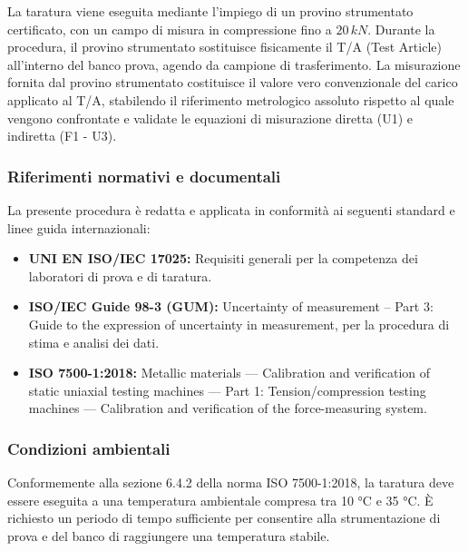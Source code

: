 \documentclass[a4paper, twoside]{article}
\begin{document}
La taratura viene eseguita mediante l'impiego di un provino strumentato certificato, con un campo di misura in compressione fino a $20\,kN$. Durante la procedura, il provino strumentato sostituisce fisicamente il T/A (Test Article) all'interno del banco prova, agendo da campione di trasferimento. La misurazione fornita dal provino strumentato costituisce il valore vero convenzionale del carico applicato al T/A, stabilendo il riferimento metrologico assoluto rispetto al quale vengono confrontate e validate le equazioni di misurazione diretta (U1) e indiretta (F1 - U3).

\subsubsection{Riferimenti normativi e documentali}
La presente procedura è redatta e applicata in conformità ai seguenti standard e linee guida internazionali:

\begin{itemize}
    \item \textbf{UNI EN ISO/IEC 17025:} Requisiti generali per la competenza dei laboratori di prova e di taratura.
    \item \textbf{ISO/IEC Guide 98-3 (GUM):} Uncertainty of measurement -- Part 3: Guide to the expression of uncertainty in measurement, per la procedura di stima e analisi dei dati.
    \item \textbf{ISO 7500-1:2018:} Metallic materials — Calibration and verification of static uniaxial testing machines — Part 1: Tension/compression testing machines — Calibration and verification of the force-measuring system.
\end{itemize}

\subsubsection{Condizioni ambientali}
Conformemente alla sezione 6.4.2 della norma ISO 7500-1:2018, la taratura deve essere eseguita a una temperatura ambientale compresa tra 10 °C e 35 °C. È richiesto un periodo di tempo sufficiente per consentire alla strumentazione di prova e del banco di raggiungere una temperatura stabile.
\end{document}
